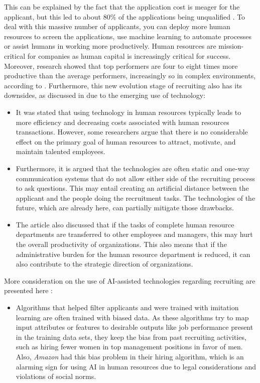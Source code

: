 \documentclass[draft,final]{thesisclass} %
\begin{document}
\begin{enumerate}
    This can be explained by the fact that the application cost is meager for the applicant, but this led to about 80\% of the applications being unqualified \parencite[4]{ai_recruiting}.
    To deal with this massive number of applicants, you can deploy more human resources to screen the applications, use machine learning to automate processes or assist humans in working more productively.
    Human resources are mission-critical for companies as human capital is increasingly critical for success.
    Moreover, research showed that top performers are four to eight times more productive than the average performers, increasingly so in complex environments, according to \textcite[4]{ai_recruiting}.
    Furthermore, this new evolution stage of recruiting also has its downsides, as discussed in \textcite[4-5]{challenges_opportunities_hr} due to the emerging use of technology:
    \begin{itemize}
        \item It was stated that using technology in human resources typically leads to more efficiency and decreasing costs associated with human resources transactions. However, some researchers argue that there is no considerable effect on the primary goal of human resources to attract, motivate, and maintain talented employees.
        \item Furthermore, it is argued that the technologies are often static and one-way communication systems that do not allow either side of the recruiting process to ask questions. This may entail creating an artificial distance between the applicant and the people doing the recruitment tasks. The technologies of the future, which are already here, can partially mitigate those drawbacks.
        \item The article also discussed that if the tasks of complete human resource departments are transferred to other employees and managers, this may hurt the overall productivity of organizations. This also means that if the administrative burden for the human resource department is reduced, it can also contribute to the strategic direction of organizations.
    \end{itemize}
    More consideration on the use of \acs{AI}-assisted technologies regarding recruiting are presented here \parencite[2-4]{ai_in_hr_management}:
    \begin{itemize}
        \item Algorithms that helped filter applicants and were trained with imitation learning are often trained with biased data. As these algorithms try to map input attributes or features to desirable outputs like job performance present in the training data sets, they keep the bias from past recruiting activities, such as hiring fewer women in top management positions in favor of men. Also, \textit{Amazon} had this bias problem in their hiring algorithm, which is an alarming sign for using \acs{AI} in human resources due to legal considerations and violations of social norms.

\end{itemize}
\end{enumerate}
\end{document}
